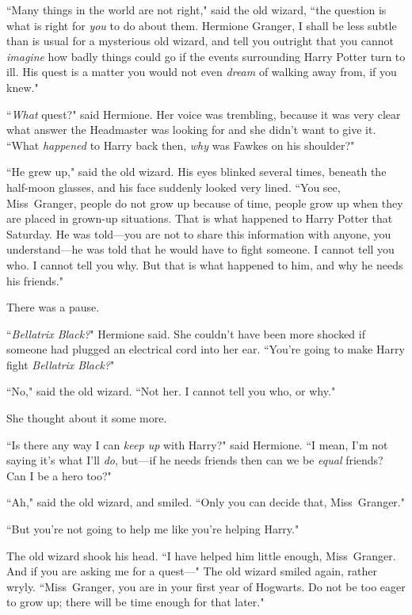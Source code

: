 ``Many things in the world are not right," said the old wizard, ``the question is what is right for \emph{you} to do about them. Hermione Granger, I shall be less subtle than is usual for a mysterious old wizard, and tell you outright that you cannot \emph{imagine} how badly things could go if the events surrounding Harry Potter turn to ill. His quest is a matter you would not even \emph{dream} of walking away from, if you knew."

``\emph{What} quest?" said Hermione. Her voice was trembling, because it was very clear what answer the Headmaster was looking for and she didn't want to give it. ``What \emph{happened} to Harry back then, \emph{why} was Fawkes on his shoulder?"

``He grew up," said the old wizard. His eyes blinked several times, beneath the half-moon glasses, and his face suddenly looked very lined. ``You see, Miss~Granger, people do not grow up because of time, people grow up when they are placed in grown-up situations. That is what happened to Harry Potter that Saturday. He was told---you are not to share this information with anyone, you understand---he was told that he would have to fight someone. I cannot tell you who. I cannot tell you why. But that is what happened to him, and why he needs his friends."

There was a pause.

``\emph{Bellatrix Black?}" Hermione said. She couldn't have been more shocked if someone had plugged an electrical cord into her ear. ``You're going to make Harry fight \emph{Bellatrix Black?}"

``No," said the old wizard. ``Not her. I cannot tell you who, or why."

She thought about it some more.

``Is there any way I can \emph{keep up} with Harry?" said Hermione. ``I mean, I'm not saying it's what I'll \emph{do}, but---if he needs friends then can we be \emph{equal} friends? Can I be a hero too?"

``Ah," said the old wizard, and smiled. ``Only you can decide that, Miss~Granger."

``But you're not going to help me like you're helping Harry."

The old wizard shook his head. ``I have helped him little enough, Miss~Granger. And if you are asking me for a quest---" The old wizard smiled again, rather wryly. ``Miss~Granger, you are in your first year of Hogwarts. Do not be too eager to grow up; there will be time enough for that later."

